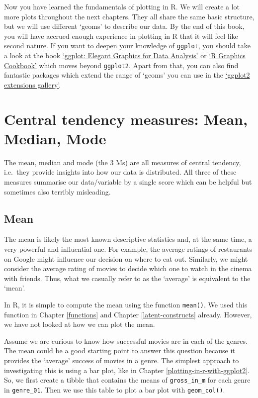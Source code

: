 \documentclass[
]{book}
\begin{document}
Now you have learned the fundamentals of plotting in R. We will create a lot more plots throughout the next chapters. They all share the same basic structure, but we will use different `geoms' to describe our data. By the end of this book, you will have accrued enough experience in plotting in R that it will feel like second nature. If you want to deepen your knowledge of \texttt{ggplot}, you should take a look at the book \href{https://ggplot2-book.org}{`ggplot: Elegant Graphics for Data Analysis'} or \href{https://r-graphics.org}{`R Graphics Cookbook'} which moves beyond \texttt{ggplot2}. Apart from that, you can also find fantastic packages which extend the range of `geoms' you can use in the \href{https://exts.ggplot2.tidyverse.org/gallery/}{`ggplot2 extensions gallery'}.

\hypertarget{central-tendency}{%
\section{Central tendency measures: Mean, Median, Mode}\label{central-tendency}}

The mean, median and mode (the 3 Ms) are all measures of central tendency, i.e.~they provide insights into how our data is distributed. All three of these measures summarise our data/variable by a single score which can be helpful but sometimes also terribly misleading.

\hypertarget{mean}{%
\subsection{Mean}\label{mean}}

The mean is likely the most known descriptive statistics and, at the same time, a very powerful and influential one. For example, the average ratings of restaurants on Google might influence our decision on where to eat out. Similarly, we might consider the average rating of movies to decide which one to watch in the cinema with friends. Thus, what we casually refer to as the `average' is equivalent to the `mean'.

In R, it is simple to compute the mean using the function \texttt{mean()}. We used this function in Chapter \ref{functions} and Chapter \ref{latent-constructs} already. However, we have not looked at how we can plot the mean.

Assume we are curious to know how successful movies are in each of the genres. The mean could be a good starting point to answer this question because it provides the `average' success of movies in a genre. The simplest approach to investigating this is using a bar plot, like in Chapter \ref{plotting-in-r-with-ggplot2}. So, we first create a tibble that contains the means of \texttt{gross\_in\_m} for each genre in \texttt{genre\_01}. Then we use this table to plot a bar plot with \texttt{geom\_col()}.
\end{document}
